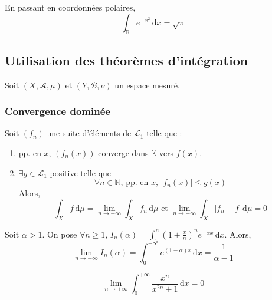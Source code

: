 	\begin{application}
		En passant en coordonnées polaires,
		\[ \int_{\mathbb{R}} e^{-x^2} \, \mathrm{d}x = \sqrt{\pi} \]
	\end{application}
	
	\subsection{Utilisation des théorèmes d'intégration}
	
	Soit $(X, \mathcal{A}, \mu)$ et $(Y, \mathcal{B}, \nu)$ un espace mesuré.
	
	\subsubsection{Convergence dominée}
	
	
	\begin{theorem}
		Soit $(f_n)$ une suite d'éléments de $\mathcal{L}_1$ telle que :
		\begin{enumerate}[label=(\roman*)]
			\item pp. en $x$, $(f_n(x))$ converge dans $\mathbb{K}$ vers $f(x)$.
			\item $\exists g \in \mathcal{L}_1$ positive telle que
			\[ \forall n \in \mathbb{N}, \, \text{pp. en } x, \, \vert f_n(x) \vert \leq g(x) \]
			Alors,
			\[ \int_X f \, \mathrm{d}\mu = \lim_{n \rightarrow +\infty} \int_X f_n \, \mathrm{d}\mu \text{ et } \lim_{n \rightarrow +\infty} \int_X \vert f_n - f \vert \, \mathrm{d}\mu = 0 \]
		\end{enumerate}
	\end{theorem}
	
	\begin{example}
		Soit $\alpha > 1$. On pose $\forall n \geq 1, \, I_n(\alpha) = \int_0^n \left( 1 + \frac{x}{n} \right)^n e^{-\alpha x} \, \mathrm{d}x$. Alors,
		\[ \lim_{n \rightarrow +\infty} I_n(\alpha) = \int_0^{+\infty} e^{(1-\alpha)x} \, \mathrm{d}x = \frac{1}{\alpha - 1} \]
	\end{example}
	
	
	\begin{example}
		\[ \lim_{n \rightarrow +\infty} \int_{0}^{+\infty} \frac{x^n}{x^{2n} + 1} \, \mathrm{d}x = 0 \]
	\end{example}
	
	
